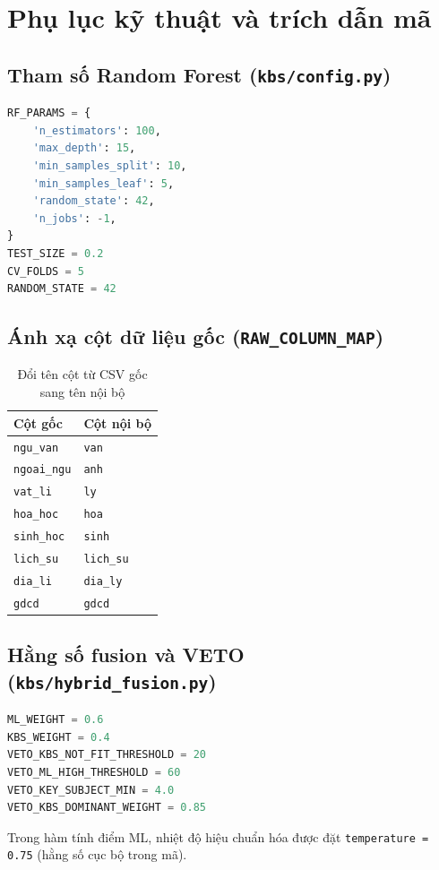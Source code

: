 \chapter{Phụ lục kỹ thuật và trích dẫn mã}

\section{Tham số Random Forest (\texttt{kbs/config.py})}
\begin{lstlisting}[language=Python]
RF_PARAMS = {
    'n_estimators': 100,
    'max_depth': 15,
    'min_samples_split': 10,
    'min_samples_leaf': 5,
    'random_state': 42,
    'n_jobs': -1,
}
TEST_SIZE = 0.2
CV_FOLDS = 5
RANDOM_STATE = 42
\end{lstlisting}

\section{Ánh xạ cột dữ liệu gốc (\texttt{RAW\_COLUMN\_MAP})}
\begin{table}[htbp]
\centering
\caption{Đổi tên cột từ CSV gốc sang tên nội bộ}
\begin{tabular}{ll}
\toprule
Cột gốc & Cột nội bộ \\
\midrule
\texttt{ngu\_van} & \texttt{van} \\
\texttt{ngoai\_ngu} & \texttt{anh} \\
\texttt{vat\_li} & \texttt{ly} \\
\texttt{hoa\_hoc} & \texttt{hoa} \\
\texttt{sinh\_hoc} & \texttt{sinh} \\
\texttt{lich\_su} & \texttt{lich\_su} \\
\texttt{dia\_li} & \texttt{dia\_ly} \\
\texttt{gdcd} & \texttt{gdcd} \\
\bottomrule
\end{tabular}
\end{table}

\section{Hằng số fusion và VETO (\texttt{kbs/hybrid\_fusion.py})}
\begin{lstlisting}[language=Python]
ML_WEIGHT = 0.6
KBS_WEIGHT = 0.4
VETO_KBS_NOT_FIT_THRESHOLD = 20
VETO_ML_HIGH_THRESHOLD = 60
VETO_KEY_SUBJECT_MIN = 4.0
VETO_KBS_DOMINANT_WEIGHT = 0.85
\end{lstlisting}
Trong hàm tính điểm ML, nhiệt độ hiệu chuẩn hóa được đặt \texttt{temperature = 0.75} (hằng số cục bộ trong mã).

